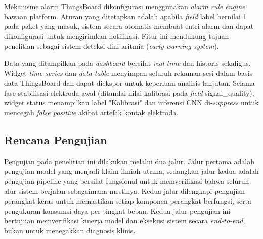 Mekanisme alarm ThingsBoard dikonfigurasi menggunakan \textit{alarm
rule engine} bawaan platform. Aturan yang ditetapkan adalah apabila
\textit{field} label bernilai 1 pada paket yang
masuk, sistem secara otomatis membuat entri alarm dan dapat
dikonfigurasi untuk mengirimkan notifikasi. Fitur ini mendukung tujuan
penelitian sebagai sistem deteksi dini aritmia (\textit{early warning
system}).

Data yang ditampilkan pada \textit{dashboard} bersifat
\textit{real-time} dan historis sekaligus. Widget \textit{time-series}
dan \textit{data table} menyimpan seluruh rekaman sesi dalam basis data
ThingsBoard dan dapat diekspor untuk keperluan analisis
lanjutan. Selama fase stabilisasi elektroda awal (ditandai
nilai kalibrasi pada \textit{field} signal\_quality), widget status
menampilkan label "Kalibrasi" dan inferensi CNN di-\textit{suppress}
untuk mencegah \textit{false positive} akibat artefak kontak elektroda.



\subsection{Rencana Pengujian}
\label{sec:rencana-pengujian}

Pengujian pada penelitian ini dilakukan melalui dua jalur. Jalur pertama adalah pengujian model yang menjadi klaim ilmiah utama, sedangkan jalur kedua adalah pengujian pipeline yang bersifat fungsional untuk memverifikasi bahwa seluruh alur sistem berjalan sebagaimana mestinya. Kedua jalur dilengkapi pengujian perangkat keras untuk memastikan setiap komponen perangkat berfungsi, serta pengukuran konsumsi daya per tingkat beban. Kedua jalur pengujian ini bertujuan memverifikasi kinerja model dan eksekusi sistem secara \textit{end-to-end}, bukan untuk menegakkan diagnosis klinis.

